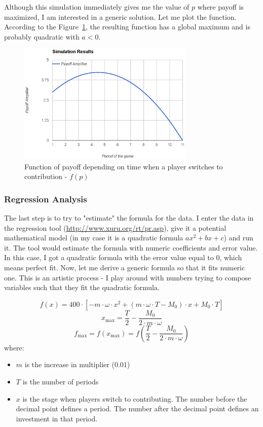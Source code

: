 			Although this simulation immediately gives me the value of $p$ where payoff is maximized, I am interested in a generic solution. Let me plot the function. According to the Figure~\ref{fig:function}, the resulting function has a global maximum and is probably quadratic with $a < 0$.

			\begin{figure}
				\begin{center}
					\includegraphics[width=8.4cm]{resources/eps/function.eps}
					\caption{Function of payoff depending on time when a player switches to contribution - $f(p)$} 
					\label{fig:function}
				\end{center}
			\end{figure}
		
		\subsubsection{Regression Analysis}
		
			The last step is to try to "estimate" the formula for the data. I enter the data in the regression tool (\url{http://www.xuru.org/rt/pr.asp}), give it a potential mathematical model (in my case it is a quadratic formula $ax^2 + bx + c$) and run it. The tool would estimate the formula with numeric coefficients and error value. In this case, I got a quadratic formula with the error value equal to $0$, which means perfect fit. Now, let me derive a generic formula so that it fits numeric one. This is an artistic process - I play around with numbers trying to compose variables such that they fit the quadratic formula.
			
			\[
				f(x) = 400 \cdot \left[ - m \cdot \omega \cdot x^2 + (m \cdot \omega \cdot T - M_0) \cdot x + M_0 \cdot T \right]
			\]
			\[
				x_\text{max} = \frac{T}{2} - \frac{M_0}{2 \cdot m \cdot \omega}
			\]
			\[
				f_\text{max} = f(x_\text{max}) = f \left(\frac{T}{2} - \frac{M_0}{2 \cdot m \cdot \omega} \right)
			\]
			where:
			\begin{itemize}
				\item
					$m$ is the increase in multiplier ($0.01$)
				\item
					$T$ is the number of periods
				\item
					$x$ is the stage when players switch to contributing. The number before the decimal point defines a period. The number after the decimal point defines an investment in that period.
			\end{itemize}
			
